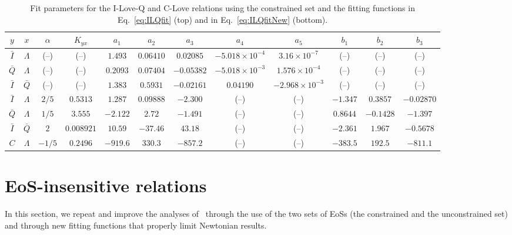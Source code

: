 \documentclass[prd,twocolumn,nofootinbib,superscriptaddress,amsmath,amssymb]{revtex4-1}
\begin{document}

\begin{table*}[htb]
\centering
\begin{tabular}{ c  c  | c c c c c c c c c c} 
 \hline
 \hline
 $y$ & $x$ & $\alpha$ & $K_{yx}$ & $a_1$ & $a_2$ & $a_3$ & $a_{4}$ & $a_{5}$ & $b_1$ & $b_2$ & $b_3$ \\
 \hline
  $\bar{I}$ & $\Lambda$ & (--) & (--) & $1.493$ & $0.06410$ & $0.02085$ & $-5.018 \times 10^{-4}$ & $3.16 \times 10^{-7}$ & (--) & (--) & (--)  \\
 $\bar{Q}$ & $\Lambda$ & (--) & (--) & $0.2093$ & $0.07404$ & $-0.05382$ & $-5.018 \times 10^{-3}$ & $1.576 \times 10^{-4}$ & (--)  &(--)  & (--) \\ 
  $\bar{I}$ & $\bar{Q}$ & (--) & (--) & $1.383$ & $0.5931$ & $-0.02161$ & $0.04190$ & $-2.968 \times 10^{-3}$ &(--)  &(--) & (--) \\
 \hline 
 $\bar{I}$ & $\Lambda$ & $2/5$ & $0.5313$ & $1.287$ & $0.09888$ & $-2.300$ & (--) & (--) & $-1.347$ & $0.3857$ & $-0.02870$\\
 $\bar{Q}$ & $\Lambda$ & $1/5$ & $3.555$ & $-2.122$ & $2.72$ & $-1.491$ & (--) & (--) & $0.8644$ & $-0.1428$ & $-1.397$\\
 $\bar{I}$ & $\bar{Q}$ & $2$ & $0.008921$ & $10.59$ & $-37.46$ & $43.18$ &(--)  &(--)  & $-2.361$ & $1.967$ & $-0.5678$\\
 $C$ & $\Lambda$ & $-1/5$ & $0.2496$ & $-919.6$ & $330.3$ & $-857.2$ & (--) & (--) & $-383.5$ & $192.5$ & $-811.1$\\
\hline
\hline
\end{tabular}
\caption{
Fit parameters for the I-Love-Q and C-Love relations using the constrained set and the fitting functions in Eq.~\eqref{eq:ILQfit} (top) and in Eq.~\eqref{eq:ILQfitNew} (bottom).
}\label{tab:ILQfitNew}
\end{table*}

\section{EoS-insensitive relations}
\label{sec:universal}

In this section, we repeat and improve the analyses of~\cite{Yagi:binLove,Yagi:ILQ} through the use of the two sets of EoSs (the constrained and the unconstrained set) and through new fitting functions that properly limit Newtonian results.   
\end{document}
